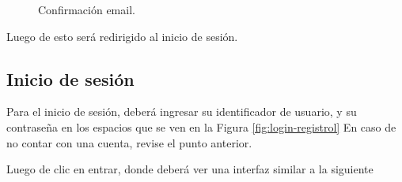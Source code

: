 \begin{enumerate}
\begin{figure}[H]
  		\caption{Confirmación email.}
  		\label{fig:confirmar}
   	\end{figure}
\end{enumerate}

Luego de esto será redirigido al inicio de sesión.

\subsection{Inicio de sesión}
Para el inicio de sesión, deberá ingresar su identificador de usuario, y su contraseña en los espacios que se ven en la Figura \ref{fig:login-registrol} En caso de no contar con una cuenta, revise el punto anterior.

Luego de clic en entrar, donde deberá ver una interfaz similar a la siguiente
